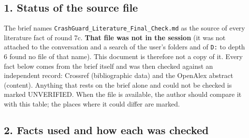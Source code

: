 


\subsection*{1. Status of the source file}

The brief names \texttt{CrashGuard\_Literature\_Final\_Check.md} as the source of every literature fact of round 7c. \textbf{That file was not in the session} (it was not attached to the conversation and a search of the user's folders and of \texttt{D:} to depth 6 found no file of that name). This document is therefore not a copy of it. Every fact below comes from the brief itself and was then checked against an independent record: Crossref (bibliographic data) and the OpenAlex abstract (content). Anything that rests on the brief alone and could not be checked is marked UNVERIFIED. When the file is available, the author should compare it with this table; the places where it could differ are marked.

\subsection*{2. Facts used and how each was checked}

